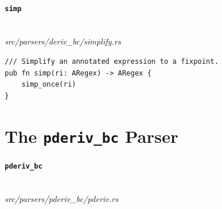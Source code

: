 \paragraph{\texttt{simp}}\ \\[-0.4em]
\textit{\small src/parsers/deriv\_bc/simplify.rs}
{\scriptsize\begin{verbatim}
/// Simplify an annotated expression to a fixpoint.
pub fn simp(ri: ARegex) -> ARegex {
    simp_once(ri)
}
\end{verbatim}}

\section{The \texttt{pderiv\_bc} Parser}
\label{app:code-pderiv-bc}

\paragraph{\texttt{pderiv\_bc}}\ \\[-0.4em]
\textit{\small src/parsers/pderiv\_bc/pderiv.rs}
